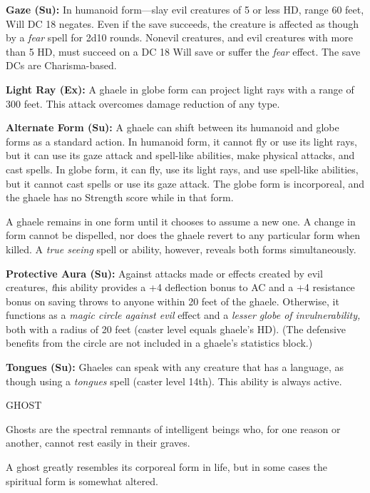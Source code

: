 \documentclass{article}
\begin{document}
\textbf{Gaze (Su): }In humanoid form---slay evil creatures of 5 or less HD, range 
60 feet, Will DC 18 negates. Even if the save succeeds, the creature is affected 
as though by a \textit{fear }spell for 2d10 rounds. Nonevil creatures, and evil 
creatures with more than 5 HD, must succeed on a DC 18 Will save or suffer the 
\textit{fear }effect. The save DCs are Charisma-based.

\textbf{Light Ray (Ex): }A ghaele in globe form can project light rays with a range 
of 300 feet. This attack overcomes damage reduction of any type.

\textbf{Alternate Form (Su):} A ghaele can shift between its humanoid and globe 
forms as a standard action. In humanoid form, it cannot fly or use its light rays, 
but it can use its gaze attack and spell-like abilities, make physical attacks, 
and cast spells. In globe form, it can fly, use its light rays, and use spell-like 
abilities, but it cannot cast spells or use its gaze attack. The globe form is 
incorporeal, and the ghaele has no Strength score while in that form.

A ghaele remains in one form until it chooses to assume a new one. A change in 
form cannot be dispelled, nor does the ghaele revert to any particular form when 
killed. A \textit{true seeing }spell or ability, however, reveals both forms simultaneously.

\textbf{Protective Aura (Su):} Against attacks made or effects created by evil 
creatures, \textit{t}his ability provides a +4 deflection bonus to AC and a +4 
resistance bonus on saving throws to anyone within 20 feet of the ghaele. Otherwise, 
it functions as a \textit{magic circle against evil }effect and a \textit{lesser 
globe of invulnerability, }both with a radius of 20 feet (caster level equals ghaele's 
HD). (The defensive benefits from the circle are not included in a ghaele's statistics 
block.)

\textbf{Tongues (Su):} Ghaeles can speak with any creature that has a language, 
as though using a \textit{tongues }spell (caster level 14th). This ability is always 
active.

\vspace{12pt}
{\LARGE{}GHOST}

Ghosts are the spectral remnants of intelligent beings who, for one reason or another, 
cannot rest easily in their graves.

A ghost greatly resembles its corporeal form in life, but in some cases the spiritual 
form is somewhat altered. 
\end{document}
